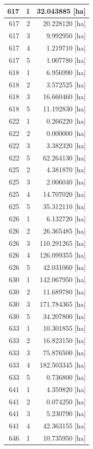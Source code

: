 \documentclass[11pt,]{book}
\begin{document}
\begin{table}
\begin{tabular}[t]{r|r|r}
\hline
617 & 1 & 32.043885 [ha]\\
\hline
617 & 2 & 20.228120 [ha]\\
\hline
617 & 3 & 9.992950 [ha]\\
\hline
617 & 4 & 1.219710 [ha]\\
\hline
617 & 5 & 1.007780 [ha]\\
\hline
618 & 1 & 6.956990 [ha]\\
\hline
618 & 2 & 3.572525 [ha]\\
\hline
618 & 3 & 16.660460 [ha]\\
\hline
618 & 5 & 11.192830 [ha]\\
\hline
622 & 1 & 0.266220 [ha]\\
\hline
622 & 2 & 0.000000 [ha]\\
\hline
622 & 3 & 3.382320 [ha]\\
\hline
622 & 5 & 62.264130 [ha]\\
\hline
625 & 2 & 4.381870 [ha]\\
\hline
625 & 3 & 2.006040 [ha]\\
\hline
625 & 4 & 14.707020 [ha]\\
\hline
625 & 5 & 35.312110 [ha]\\
\hline
626 & 1 & 6.132720 [ha]\\
\hline
626 & 2 & 26.365485 [ha]\\
\hline
626 & 3 & 110.291265 [ha]\\
\hline
626 & 4 & 126.099355 [ha]\\
\hline
626 & 5 & 42.031060 [ha]\\
\hline
630 & 1 & 142.067950 [ha]\\
\hline
630 & 2 & 11.689780 [ha]\\
\hline
630 & 3 & 171.784365 [ha]\\
\hline
630 & 5 & 34.207800 [ha]\\
\hline
633 & 1 & 10.301855 [ha]\\
\hline
633 & 2 & 16.823150 [ha]\\
\hline
633 & 3 & 75.876500 [ha]\\
\hline
633 & 4 & 182.503345 [ha]\\
\hline
633 & 5 & 0.736800 [ha]\\
\hline
641 & 1 & 4.359820 [ha]\\
\hline
641 & 2 & 0.074250 [ha]\\
\hline
641 & 3 & 5.230790 [ha]\\
\hline
641 & 4 & 42.363155 [ha]\\
\hline
646 & 1 & 10.735950 [ha]\\

\end{tabular}
\end{table}
\end{document}
